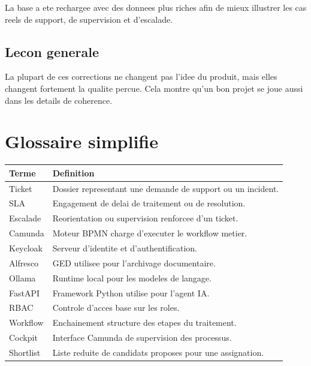 \documentclass[12pt,a4paper,oneside]{report}
\begin{document}
La base a ete rechargee avec des donnees plus riches afin de mieux illustrer les cas reels de support, de supervision et d'escalade.

\section{Lecon generale}

La plupart de ces corrections ne changent pas l'idee du produit, mais elles changent fortement la qualite percue. Cela montre qu'un bon projet se joue aussi dans les details de coherence.

\chapter{Glossaire simplifie}

\begin{longtable}{>{\raggedright\arraybackslash}p{3.2cm} >{\raggedright\arraybackslash}p{9.8cm}}
\toprule
Terme & Definition \\
\midrule
Ticket & Dossier representant une demande de support ou un incident. \\
SLA & Engagement de delai de traitement ou de resolution. \\
Escalade & Reorientation ou supervision renforcee d'un ticket. \\
Camunda & Moteur BPMN charge d'executer le workflow metier. \\
Keycloak & Serveur d'identite et d'authentification. \\
Alfresco & GED utilisee pour l'archivage documentaire. \\
Ollama & Runtime local pour les modeles de langage. \\
FastAPI & Framework Python utilise pour l'agent IA. \\
RBAC & Controle d'acces base sur les roles. \\
Workflow & Enchainement structure des etapes du traitement. \\
Cockpit & Interface Camunda de supervision des processus. \\
Shortlist & Liste reduite de candidats proposes pour une assignation. \\
\bottomrule
\end{longtable}
\end{document}
